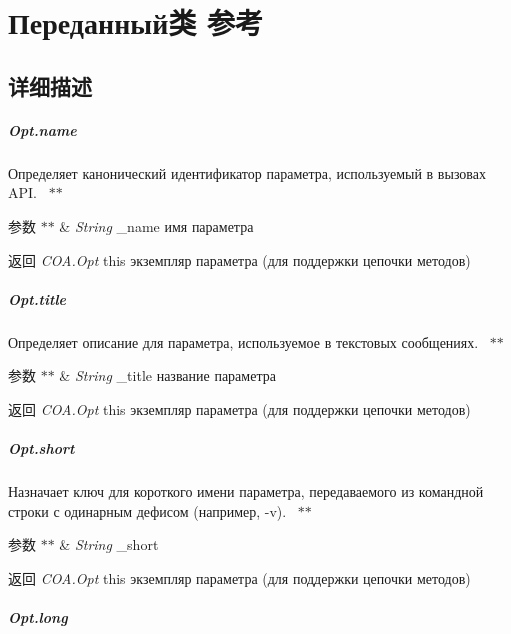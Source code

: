 \hypertarget{class_xD0_x9F_xD0_xB5_xD1_x80_xD0_xB5_xD0_xB4_xD0_xB0_xD0_xBD_xD0_xBD_xD1_x8B_xD0_xB9}{}\section{Переданный类 参考}
\label{class_xD0_x9F_xD0_xB5_xD1_x80_xD0_xB5_xD0_xB4_xD0_xB0_xD0_xBD_xD0_xBD_xD1_x8B_xD0_xB9}


\subsection{详细描述}
\subparagraph*{Opt.\+name}

Определяет канонический идентификатор параметра, используемый в вызовах A\+PI.~\newline
 $\ast$$\ast$
\begin{DoxyParams}{参数}
{\em $\ast$$\ast$} & {\itshape String} {\ttfamily \+\_\+name} имя параметра~\newline
 {\bfseries }\\
\hline
\end{DoxyParams}
\begin{DoxyReturn}{返回}
{\bfseries } {\itshape C\+O\+A.\+Opt} {\ttfamily this} экземпляр параметра (для поддержки цепочки методов)
\end{DoxyReturn}
\subparagraph*{Opt.\+title}

Определяет описание для параметра, используемое в текстовых сообщениях.~\newline
 $\ast$$\ast$
\begin{DoxyParams}{参数}
{\em $\ast$$\ast$} & {\itshape String} {\ttfamily \+\_\+title} название параметра~\newline
 {\bfseries }\\
\hline
\end{DoxyParams}
\begin{DoxyReturn}{返回}
{\bfseries } {\itshape C\+O\+A.\+Opt} {\ttfamily this} экземпляр параметра (для поддержки цепочки методов)
\end{DoxyReturn}
\subparagraph*{Opt.\+short}

Назначает ключ для короткого имени параметра, передаваемого из командной строки с одинарным дефисом (например, {\ttfamily -\/v}).~\newline
 $\ast$$\ast$
\begin{DoxyParams}{参数}
{\em $\ast$$\ast$} & {\itshape String} {\ttfamily \+\_\+short}~\newline
 {\bfseries }\\
\hline
\end{DoxyParams}
\begin{DoxyReturn}{返回}
{\bfseries } {\itshape C\+O\+A.\+Opt} {\ttfamily this} экземпляр параметра (для поддержки цепочки методов)
\end{DoxyReturn}
\subparagraph*{Opt.\+long}

